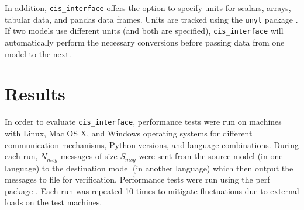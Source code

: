 \documentclass[journal]{IEEEtran}
\newcommand{\cis}{{\tt cis\_interface}{}}
\begin{document}
%
In addition, {\cis} offers the option to specify units for scalars, arrays, tabular data, and pandas data frames. Units are tracked using the {\tt unyt} package \citep{Goldbaum2018}. If two models use different units (and both are specified), {\cis} will automatically perform the necessary conversions before passing data from one model to the next.

\section{Results}\label{S:results}
%
In order to evaluate {\cis}, performance tests were run on machines with Linux, Mac OS X, and Windows operating systems for different communication mechanisms, Python versions, and language combinations. During each run, $N_{msg}$ messages of size $S_{msg}$ were sent from the source model (in one language) to the destination model (in another language) which then output the messages to file for verification. Performance tests were run using the perf package \citep{Stinner2018}. Each run was repeated 10 times to mitigate fluctuations due to external loads on the test machines.

\end{document}
